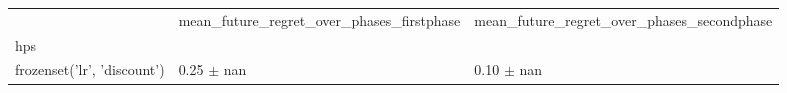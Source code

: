 \begin{tabular}{lll}
\toprule
 & mean_future_regret_over_phases_firstphase & mean_future_regret_over_phases_secondphase \\
hps &  &  \\
\midrule
frozenset({'lr', 'discount'}) & 0.25 $\pm$ nan & 0.10 $\pm$ nan \\
\bottomrule
\end{tabular}
